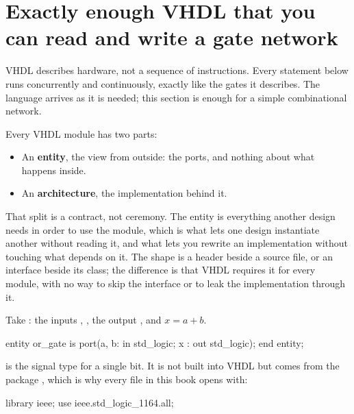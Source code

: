 \section{Exactly enough VHDL that you can read and write a gate network}
\label{c1:sec:vhdl}

VHDL describes hardware, not a sequence of instructions. Every statement below runs concurrently
and continuously, exactly like the gates it describes. The language arrives as it is needed; this
section is enough for a simple combinational network.

Every VHDL module has two parts:
\begin{itemize}
  \item An \textbf{entity}, the view from outside: the ports, and nothing about what happens
    inside.
  \item An \textbf{architecture}, the implementation behind it.
\end{itemize}

That split is a contract, not ceremony. The entity is everything another design needs in order to
use the module, which is what lets one design instantiate another without reading it, and what lets
you rewrite an implementation without touching what depends on it. The shape is a header beside a
source file, or an interface beside its class; the difference is that VHDL requires it for every
module, with no way to skip the interface or to leak the implementation through it.

Take : the inputs , , the output , and $x = a + b$.

\begin{vhdlcode}
entity or_gate is
    port(a, b: in std_logic;
         x   : out std_logic);
end entity;
\end{vhdlcode}


 is the signal type for a single bit. It is not built into VHDL but comes from the
package , which is why every file in this book opens with:

\begin{vhdlcode}
library ieee;
use ieee.std_logic_1164.all;
\end{vhdlcode}

